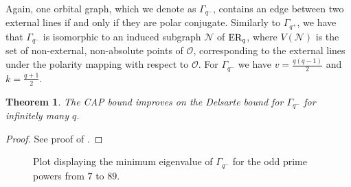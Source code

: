 \documentclass[11pt, baustms]{amsproc}
\theoremstyle{scplain}
\newtheorem{theorem}{Theorem}[section]
\begin{document}
Again, one orbital graph, which we denote as $\Gamma_{q^-}$, contains an edge between two external lines if and only if they are polar conjugate. Similarly to $\Gamma_{q^+}$, we have that $\Gamma_{q^-}$ is isomorphic to an induced subgraph $\mathcal{N}$ of $\textnormal{ER}_q$, where $V(\mathcal{N})$ is the set of non-external, non-absolute points of $\mathcal{O}$, corresponding to the external lines under the polarity mapping with respect to $\mathcal{O}$. For $\Gamma_{q^-}$ we have $v = \frac{q(q-1)}{2}$ and $k= \frac{q+1}{2}$.

\begin{theorem}
	\label{edge_reg_2}
		The CAP bound improves on the Delsarte bound for $\Gamma_{q^-}$ for infinitely many $q$.
\end{theorem}


\begin{proof}
	 See proof of .
\end{proof}

\begin{figure}[!ht]
	\captionsetup{width=.6\linewidth}
\begin{center}
\end{center}
\caption{Plot displaying the minimum eigenvalue of $\Gamma_{q^-}$ for the odd prime powers from $7$ to $89$.}
\label{mini}
\end{figure}
\end{document}

